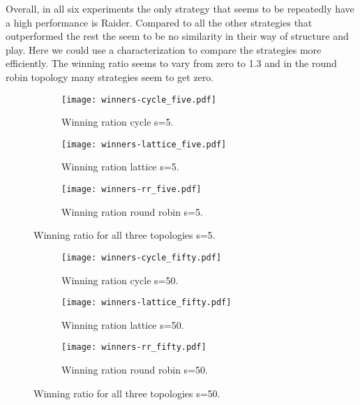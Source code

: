 Overall, in all six experiments the only strategy that seems to be repeatedly
have a high performance is
Raider. Compared to all the other strategies that outperformed the rest the seem
to be no similarity in their way of structure and play. Here we could use
a characterization to compare the strategies more efficiently. The winning ratio
seems to vary from zero to 1.3 and in the round robin topology many strategies
seem to get zero.


\begin{figure}[!hbtp]
\centering
    \begin{subfigure}[t]{1\textwidth}
    \centering
        \texttt{[image: winners-cycle\_five.pdf]}
    \caption{Winning ration cycle s=5.}
    \end{subfigure}
\hfill
    \begin{subfigure}[t]{1\textwidth}\centering
    \centering
        \texttt{[image: winners-lattice\_five.pdf]}
    \caption{Winning ration lattice s=5.}
    \end{subfigure}
\hfill
    \begin{subfigure}[t]{1\textwidth}\centering
    \centering
        \texttt{[image: winners-rr\_five.pdf]}
    \caption{Winning ration round robin s=5.}
    \end{subfigure}
\caption{Winning ratio for all three topologies s=5.}
\label{fig:winning-five}
\end{figure}

\begin{figure}[H]
\centering
    \begin{subfigure}[t]{1\textwidth}
    \centering
        \texttt{[image: winners-cycle\_fifty.pdf]}
    \caption{Winning ration cycle s=50.}
    \end{subfigure}
\hfill
    \begin{subfigure}[t]{1\textwidth}\centering
    \centering
        \texttt{[image: winners-lattice\_fifty.pdf]}
    \caption{Winning ration lattice s=50.}
    \end{subfigure}
\hfill
    \begin{subfigure}[t]{1\textwidth}\centering
    \centering
        \texttt{[image: winners-rr\_fifty.pdf]}
    \caption{Winning ration round robin s=50.}
    \end{subfigure}
\caption{Winning ratio for all three topologies s=50.}
\label{fig:winning-fifty}
\end{figure}

